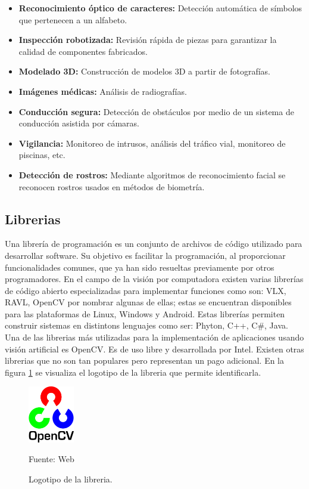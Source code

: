 \begin{itemize}
    \item \textbf{Reconocimiento óptico de caracteres:} Detección automática de símbolos que pertenecen a un alfabeto.
    \item \textbf{Inspección robotizada:} Revisión rápida de piezas para garantizar la calidad de componentes fabricados.
    \item \textbf{Modelado 3D:} Construcción de modelos 3D a partir de fotografías.
    \item \textbf{Imágenes médicas:} Análisis de radiografías.
    \item \textbf{Conducción segura:} Detección de obstáculos por medio de un sistema de conducción asistida por cámaras.
    \item \textbf{Vigilancia:} Monitoreo de intrusos, análisis del tráfico vial, monitoreo de piscinas, etc.
    \item \textbf{Detección de rostros:} Mediante algoritmos de reconocimiento facial se reconocen rostros usados en métodos de biometría.
\end{itemize}

\subsection{Librerias}
Una librería de programación es un conjunto de archivos de código utilizado para desarrollar software. Su objetivo es facilitar la programación, al proporcionar funcionalidades comunes, que ya han sido resueltas previamente por otros programadores. En el campo de la visión por computadora existen varias librerías de código abierto especializadas para implementar funciones como son: VLX, RAVL, OpenCV por nombrar algunas de ellas; estas se encuentran disponibles para las plataformas de Linux, Windows y Android. Estas librerías permiten construir sistemas en distintons lenguajes como ser: Phyton, C++, C\#, Java.\\

Una de las librerias más utilizadas para la implementación de aplicaciones usando visión artificial es OpenCV. Es de uso libre y desarrollada por Intel. Existen otras librerias que no son tan populares pero representan un pago adicional. En la figura \ref{fig:cv2_logo} se visualiza el logotipo de la libreria que permite identificarla.\\

\begin{figure}[H]
    \begin{center}
        \includegraphics[width=2cm]{img/capitulo_2/cv2_logo.png}
    \end{center}
    \begin{center}
        \caption{Logotipo de la libreria.}
        Fuente: Web
        \label{fig:cv2_logo}    
    \end{center}
\end{figure}

